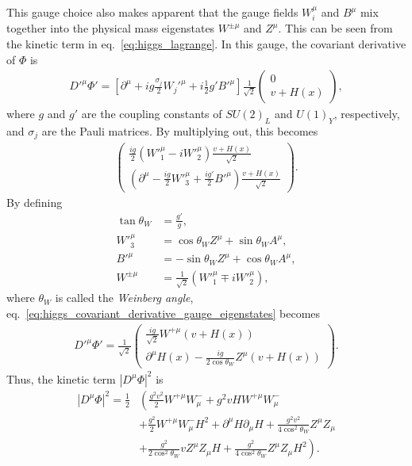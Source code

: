 \documentclass[twoside,english]{uiofysmaster}
\begin{document}
This gauge choice also makes apparent that the gauge fields $W^\mu_i$ and $B^\mu$ mix together into the physical mass eigenstates $W^{\pm\mu}$ and $Z^\mu$. This can be seen from the kinetic term in eq.\ \eqref{eq:higgs_lagrange}. In this gauge, the covariant derivative of $\Phi$ is
\begin{align}
	D'^\mu \Phi' = \left[ \partial^\mu + i g \frac{\sigma_j}{2} W_j'^\mu + i \frac{1}{2} g' B'^\mu \right]\frac{1}{\sqrt{2}}\begin{pmatrix}
		0 \\ v + H(x)
	\end{pmatrix},
\end{align}
where $g$ and $g'$ are the coupling constants of $SU(2)_L$ and $U(1)_Y$, respectively, and $\sigma_j$ are the Pauli matrices. By multiplying out, this becomes
\begin{align}
	\begin{pmatrix}
		\frac{ig}{2}(W'^\mu_1 - iW'^\mu_2) \frac{v+H(x)}{\sqrt{2}} \\
		\left( \partial^\mu - \frac{ig}{2}W'^\mu_3 + \frac{ig'}{2} B'^\mu \right) \frac{v+H(x)}{\sqrt{2}}\nonumber \label{eq:higgs_covariant_derivative_gauge_eigenstates}
	\end{pmatrix}.
\end{align}
By defining 
\begin{align}
	\tan\theta_W &= \frac{g'}{g},\nonumber\\
	{W'}^\mu_3 &= \cos\theta_W Z^\mu + \sin\theta_W A^\mu,\\
	{B'}^\mu &= -\sin\theta_W Z^\mu + \cos\theta_W A^\mu,\nonumber\\
	W^{\pm \mu} &= \frac{1}{\sqrt{2}} \left({W'}_1^\mu \mp i{W'}_2^\mu \right),\nonumber
\end{align}
where $\theta_W$ is called the {\it Weinberg angle}, eq.\ \eqref{eq:higgs_covariant_derivative_gauge_eigenstates} becomes 
\begin{align}
	D'^\mu\Phi' = \frac{1}{\sqrt{2}} \begin{pmatrix}
		\frac{ig}{\sqrt{2}} W^{+\mu}\left(v+H(x)\right) \\
		\partial^\mu H(x) - \frac{ig}{2\cos\theta_W}Z^\mu \left(v+H(x)\right) 
	\end{pmatrix}.
\end{align}
Thus, the kinetic term $|D^\mu \Phi|^2$ is
\begin{align}
	|D^\mu \Phi|^2 = \frac{1}{2}&\left( \frac{g^2v^2}{2} W^{+\mu} W^-_\mu + g^2vHW^{+\mu}W^-_\mu \right.\nonumber\\
	&+ \frac{g^2}{2} W^{+\mu}W^-_\mu H^2 + \partial^\mu H \partial_\mu H + \frac{g^2v^2}{4\cos^2\theta_W} Z^\mu Z_\mu \\
	&+ \left. \frac{g^2}{2\cos^2\theta_W} v Z^\mu Z_\mu H + \frac{g^2}{4\cos^2\theta_W}Z^\mu Z_\mu H^2 \right).\nonumber
\end{align}
\end{document}
